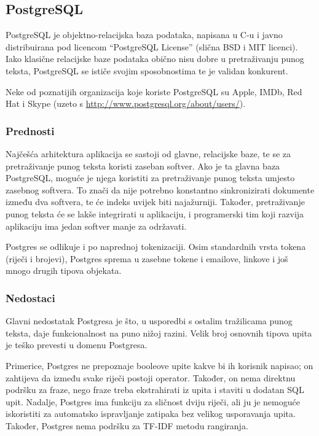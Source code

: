 \documentclass[a4paper,twoside,12pt]{scrreprt}
\begin{document}
\subsection{PostgreSQL}

PostgreSQL je objektno-relacijska baza podataka, napisana u C-u i javno distribuirana pod licencom ``PostgreSQL License'' (slična BSD i MIT licenci). Iako klasične relacijske baze podataka obično nisu dobre u pretraživanju punog teksta, PostgreSQL se ističe svojim sposobnostima te je validan konkurent.

Neke od poznatijih organizacija koje koriste PostgreSQL su Apple, IMDb, Red Hat i Skype (uzeto s \url{http://www.postgresql.org/about/users/}).

\subsubsection{Prednosti}

Najčešća arhitektura aplikacija se sastoji od glavne, relacijske baze, te se za pretraživanje punog teksta koristi zaseban softver. Ako je ta glavna baza PostgreSQL, moguće je njega koristiti za pretraživanje punog teksta umjesto zasebnog softvera. To znači da nije potrebno konstantno sinkronizirati dokumente između dva softvera, te će indeks uvijek biti najažurniji. Također, pretraživanje punog teksta će se lakše integrirati u aplikaciju, i programerski tim koji razvija aplikaciju ima jedan softver manje za održavati.

Postgres se odlikuje i po naprednoj tokenizaciji. Osim standardnih vrsta tokena (riječi i brojevi), Postgres sprema u zasebne tokene i emailove, linkove i još mnogo drugih tipova objekata.

\subsubsection{Nedostaci}

Glavni nedostatak Postgresa je što, u usporedbi s ostalim tražilicama punog teksta, daje funkcionalnost na puno nižoj razini. Velik broj osnovnih tipova upita je teško prevesti u domenu Postgresa.

Primerice, Postgres ne prepoznaje booleove upite kakve bi ih korisnik napisao; on zahtijeva da između svake riječi postoji operator. Također, on nema direktnu podršku za fraze, nego fraze treba ekstrahirati iz upita i staviti u dodatan SQL upit. Nadalje, Postgres ima funkciju za sličnost dviju riječi, ali ju je nemoguće iskoristiti za automatsko ispravljanje zatipaka bez velikog usporavanja upita. Također, Postgres nema podršku za TF-IDF metodu rangiranja.
\end{document}
